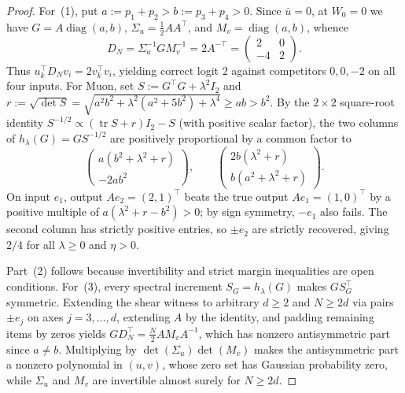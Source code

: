\documentclass[11pt]{article}
\theoremstyle{plain}
\theoremstyle{definition}
\theoremstyle{remark}
\DeclareMathOperator{\diag}{diag}
\DeclareMathOperator{\tr}{tr}
\begin{document}
\begin{proof}
For~(1), put $a := p_1 + p_2 > b := p_3 + p_4 > 0$.
Since $\bar u = 0$, at $W_0 = 0$ we have $G = A\diag(a, b)$, $\Sigma_u = \frac{1}{2} A A^\top$, and $M_v = \diag(a, b)$, whence
\[
D_N = \Sigma_u^{-1} G M_v^{-1} = 2 A^{-\top} = \begin{pmatrix} 2 & 0 \\ -4 & 2 \end{pmatrix}.
\]
Thus $u_k^\top D_N v_i = 2 v_k^\top v_i$, yielding correct logit $2$ against competitors $0, 0, -2$ on all four inputs.
For Muon, set $S := G^\top G + \lambda^2 I_2$ and $r := \sqrt{\det S} = \sqrt{a^2 b^2 + \lambda^2(a^2+5b^2) + \lambda^4} \ge ab > b^2$.
By the $2 \times 2$ square-root identity $S^{-1/2} \propto (\tr S + r)I_2 - S$ (with positive scalar factor), the two columns of $h_\lambda(G) = G S^{-1/2}$ are positively proportional by a common factor to
\[
\begin{pmatrix} a(b^2 + \lambda^2 + r) \\ -2ab^2 \end{pmatrix},
\qquad
\begin{pmatrix} 2b(\lambda^2 + r) \\ b(a^2 + \lambda^2 + r) \end{pmatrix}.
\]
On input $e_1$, output $Ae_2 = (2, 1)^\top$ beats the true output $Ae_1 = (1, 0)^\top$ by a positive multiple of $a(\lambda^2 + r - b^2) > 0$; by sign symmetry, $-e_1$ also fails.
The second column has strictly positive entries, so $\pm e_2$ are strictly recovered, giving $2/4$ for all $\lambda \ge 0$ and $\eta > 0$.

Part~(2) follows because invertibility and strict margin inequalities are open conditions.
For~(3), every spectral increment $S_G = h_\lambda(G)$ makes $G S_G^\top$ symmetric.
Extending the shear witness to arbitrary $d \ge 2$ and $N \ge 2d$ via pairs $\pm e_j$ on axes $j = 3,\dots,d$, extending $A$ by the identity, and padding remaining items by zeros yields $G D_N^\top = \frac{N}{2} A M_v A^{-1}$, which has nonzero antisymmetric part since $a \neq b$.
Multiplying by $\det(\Sigma_u)\det(M_v)$ makes the antisymmetric part a nonzero polynomial in $(u, v)$, whose zero set has Gaussian probability zero, while $\Sigma_u$ and $M_v$ are invertible almost surely for $N \ge 2d$.
\end{proof}
\end{document}
